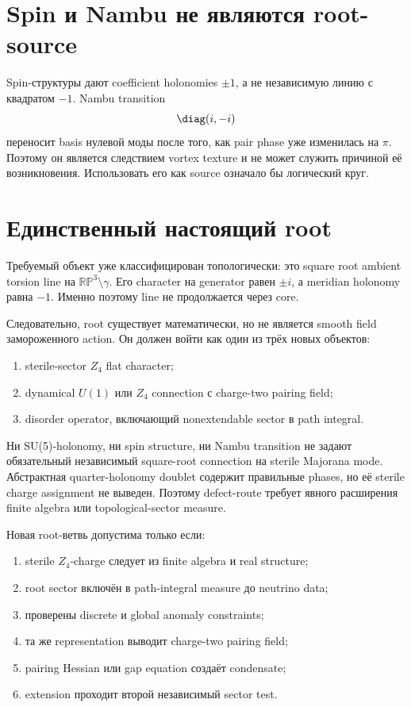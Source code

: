 \section{Spin и Nambu не являются root-source}

Spin-структуры дают coefficient holonomies \(\pm1\), а не независимую линию
с квадратом \(-1\). Nambu transition
\begin{equation}
 \diag(i,-i)
\end{equation}
переносит basis нулевой моды после того, как pair phase уже изменилась на
\(\pi\). Поэтому он является следствием vortex texture и не может служить
причиной её возникновения. Использовать его как source означало бы
логический круг.

\section{Единственный настоящий root}

Требуемый объект уже классифицирован топологически: это square root
ambient torsion line на
\(\mathbb{RP}^3\setminus\gamma\). Его character на generator равен
\(\pm i\), а meridian holonomy равна \(-1\). Именно поэтому line не
продолжается через core.

Следовательно, root существует математически, но не является smooth field
замороженного action. Он должен войти как один из трёх новых объектов:
\begin{enumerate}
 \item sterile-sector \(Z_4\) flat character;
 \item dynamical \(U(1)\) или \(Z_4\) connection с charge-two pairing field;
 \item disorder operator, включающий nonextendable sector в path integral.
\end{enumerate}

\begin{theorem}
Ни SU(5)-holonomy, ни spin structure, ни Nambu transition не задают
обязательный независимый square-root connection на sterile Majorana mode.
Абстрактная quarter-holonomy doublet содержит правильные phases, но её
sterile charge assignment не выведен. Поэтому defect-route требует явного
расширения finite algebra или topological-sector measure.
\end{theorem}

\begin{protocol}
Новая root-ветвь допустима только если:
\begin{enumerate}
 \item sterile \(Z_4\)-charge следует из finite algebra и real structure;
 \item root sector включён в path-integral measure до neutrino data;
 \item проверены discrete и global anomaly constraints;
 \item та же representation выводит charge-two pairing field;
 \item pairing Hessian или gap equation создаёт condensate;
 \item extension проходит второй независимый sector test.
\end{enumerate}
\end{protocol}

